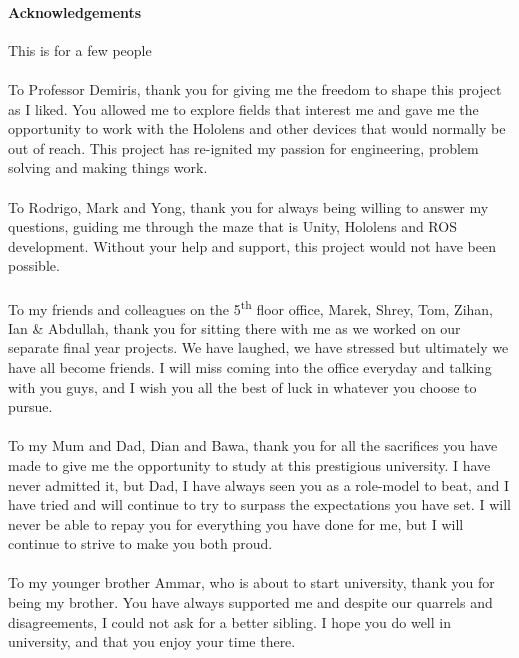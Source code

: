 \newpage

\paragraph{Acknowledgements} This is for a few people

\paragraph{}To Professor Demiris, thank you for giving me the freedom to shape this project as I liked. You allowed me to explore fields that interest me and gave me the opportunity to work with the Hololens and other devices that would normally be out of reach. This project has re-ignited my passion for engineering, problem solving and making things work.

\paragraph{}To Rodrigo, Mark and Yong, thank you for always being willing to answer my questions, guiding me through the maze that is Unity, Hololens and ROS development. Without your help and support, this project would not have been possible.

\paragraph{}To my friends and colleagues on the 5\textsuperscript{th} floor office, Marek, Shrey, Tom, Zihan, Ian \& Abdullah, thank you for sitting there with me as we worked on our separate final year projects. We have laughed, we have stressed but ultimately we have all become friends. I will miss coming into the office everyday and talking with you guys, and I wish you all the best of luck in whatever you choose to pursue.

\paragraph{}To my Mum and Dad, Dian and Bawa, thank you for all the sacrifices you have made to give me the opportunity to study at this prestigious university. I have never admitted it, but Dad, I have always seen you as a role-model to beat, and I have tried and will continue to try to surpass the expectations you have set. I will never be able to repay you for everything you have done for me, but I will continue to strive to make you both proud.

\paragraph{}To my younger brother Ammar, who is about to start university, thank you for being my brother. You have always supported me and despite our quarrels and disagreements, I could not ask for a better sibling. I hope you do well in university, and that you enjoy your time there.


